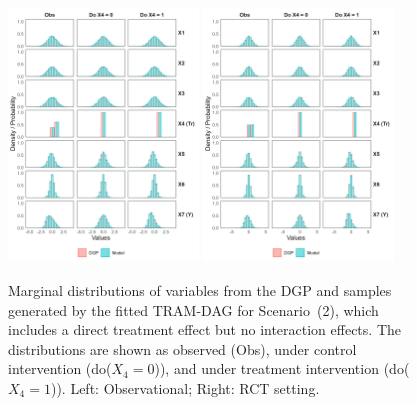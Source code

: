 \begin{figure}[htbp]
\centering
\includegraphics[width=0.45\textwidth]{img/results/observ_scenario2_sampling_distributions_vertical.png}
\includegraphics[width=0.45\textwidth]{img/results/rct_scenario2_sampling_distributions_vertical.png}
\caption{Marginal distributions of variables from the DGP and samples generated by the fitted TRAM-DAG for Scenario~(2), which includes a direct treatment effect but no interaction effects. The distributions are shown as observed (Obs), under control intervention (do($X_4 = 0$)), and under treatment intervention (do($X_4 = 1$)). Left: Observational; Right: RCT setting.}
\label{fig:scenario2_sampling_distributions_vertical}
\end{figure}


